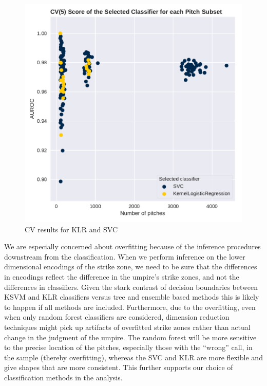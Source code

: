 \documentclass[letterpaper,12pt]{article}
\begin{document}
\begin{figure}
\centering
    \includegraphics[scale=0.4]{graphics/classifiers_cv_results.pdf}
    \vspace{-0.7cm}
    \caption{CV results for KLR and SVC}
    \label{fig:class-cv-res}
\end{figure}

We are especially concerned about overfitting because of the inference procedures downstream from the classification. 
When we perform inference on the lower dimensional encodings of the strike zone, we need to be sure that the differences in encodings reflect the difference in the umpire's strike zones, and not the differences in classifiers. 
Given the stark contrast of decision boundaries between KSVM and KLR classifiers versus tree and ensemble based methods this is likely to happen if all methods are included. 
Furthermore, due to the overfitting, even when only random forest classifiers are considered, dimension reduction techniques might pick up artifacts of overfitted strike zones rather than actual change in the judgment of the umpire.
The random forest will be more sensitive to the precise location of the pitches, especially those with the ``wrong'' call, in the sample (thereby overfitting), whereas the SVC and KLR are more flexible and give shapes that are more consistent. 
This further supports our choice of classification methods in the analysis. 
\end{document}
